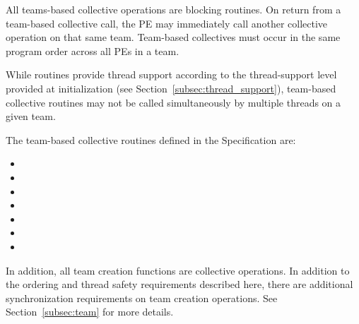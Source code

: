 All \openshmem teams-based collective operations are blocking routines.  On
return from a team-based collective call, the \ac{PE} may immediately call
another collective operation on that same team.
Team-based collectives must occur in the same
program order across all \acp{PE} in a team.

While \openshmem routines provide thread support according to the
thread-support level provided at initialization (see
Section~\ref{subsec:thread_support}), team-based collective routines
may not be called simultaneously by multiple threads on a given team.

The team-based collective routines defined in the \openshmem Specification are:

\begin{itemize}
\item {}
\item {}
\item {}
\item {}
\item {}
\item {}
\item {}
\end{itemize}

In addition, all team creation functions are collective operations. In addition to the ordering
and thread safety requirements described here, there are additional synchronization requirements
on team creation operations. See Section~\ref{subsec:team} for more details.

